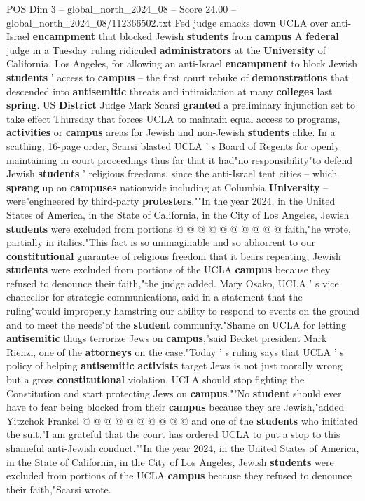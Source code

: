 \begin{textsample}{POS Dim 3 – global\_north\_2024\_08 – Score 24.00 – global\_north\_2024\_08/112366502.txt}  \label{ex:f3_pos_133}
Fed judge smacks down UCLA over anti-Israel \textbf{encampment} that blocked Jewish \textbf{students} from \textbf{campus} A \textbf{federal} judge in a Tuesday ruling ridiculed \textbf{administrators} at the \textbf{University} of California, Los Angeles, for allowing an anti-Israel \textbf{encampment} to block Jewish \textbf{students} ' access to \textbf{campus} -- the first court rebuke of \textbf{demonstrations} that descended into \textbf{antisemitic} threats and intimidation at many \textbf{colleges} last \textbf{spring}.
US \textbf{District} Judge Mark Scarsi \textbf{granted} a preliminary injunction set to take effect Thursday that forces UCLA to maintain equal access to programs, \textbf{activities} or \textbf{campus} areas for Jewish and non-Jewish \textbf{students} alike.
In a scathing, 16-page order, Scarsi blasted UCLA ' s Board of Regents for openly maintaining in court proceedings thus far that it had"no responsibility"to defend Jewish \textbf{students} ' religious freedoms, since the anti-Israel tent cities -- which \textbf{sprang} up on \textbf{campuses} nationwide including at Columbia \textbf{University} -- were"engineered by third-party \textbf{protesters}.""In the year 2024, in the United States of America, in the State of California, in the City of Los Angeles, Jewish \textbf{students} were excluded from portions @ @ @ @ @ @ @ @ @ @ faith,"he wrote, partially in italics."This fact is so unimaginable and so abhorrent to our \textbf{constitutional} guarantee of religious freedom that it bears repeating, Jewish \textbf{students} were excluded from portions of the UCLA \textbf{campus} because they refused to denounce their faith,"the judge added.
Mary Osako, UCLA ' s vice chancellor for strategic communications, said in a statement that the ruling"would improperly hamstring our ability to respond to events on the ground and to meet the needs"of the \textbf{student} community."Shame on UCLA for letting \textbf{antisemitic} thugs terrorize Jews on \textbf{campus},"said Becket president Mark Rienzi, one of the \textbf{attorneys} on the case."Today ' s ruling says that UCLA ' s policy of helping \textbf{antisemitic} \textbf{activists} target Jews is not just morally wrong but a gross \textbf{constitutional} violation.
UCLA should stop fighting the Constitution and start protecting Jews on \textbf{campus}.""No \textbf{student} should ever have to fear being blocked from their \textbf{campus} because they are Jewish,"added Yitzchok Frankel @ @ @ @ @ @ @ @ @ @ and one of the \textbf{students} who initiated the suit."I am grateful that the court has ordered UCLA to put a stop to this shameful anti-Jewish conduct.""In the year 2024, in the United States of America, in the State of California, in the City of Los Angeles, Jewish \textbf{students} were excluded from portions of the UCLA \textbf{campus} because they refused to denounce their faith,"Scarsi wrote.

\end{textsample}
